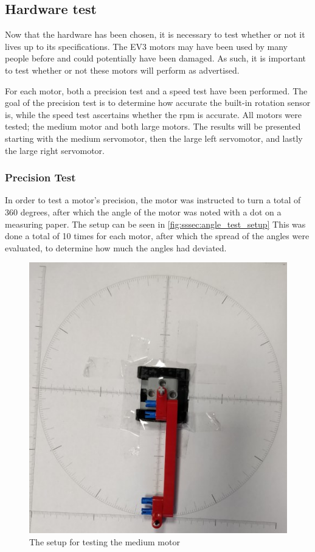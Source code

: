 \subsection{Hardware test}
Now that the hardware has been chosen, it is necessary to test whether or not it lives up to its specifications.
The EV3 motors may have been used by many people before and could potentially have been damaged.
As such, it is important to test whether or not these motors will perform as advertised.

For each motor, both a precision test and a speed test have been performed.
The goal of the precision test is to determine how accurate the built-in rotation sensor is, while the speed test ascertains whether the rpm is accurate.
All motors were tested; the medium motor and both large motors.
The results will be presented starting with the medium servomotor, then the large left servomotor, and lastly the large right servomotor.

\subsubsection{Precision Test}
In order to test a motor's precision, the motor was instructed to turn a total of 360 degrees, after which the angle of the motor was noted with a dot on a measuring paper.
The setup can be seen in \autoref{fig:sssec:angle_test_setup}
This was done a total of 10 times for each motor, after which the spread of the angles were evaluated, to determine how much the angles had deviated.

\begin{figure}[H]
    \centering
    \includegraphics[scale = 0.5]{images/techAnalysis/MediumMotorAngleTest.jpg}
    \caption{The setup for testing the medium motor}\label{fig:sssec:angle_test_setup}
\end{figure}

